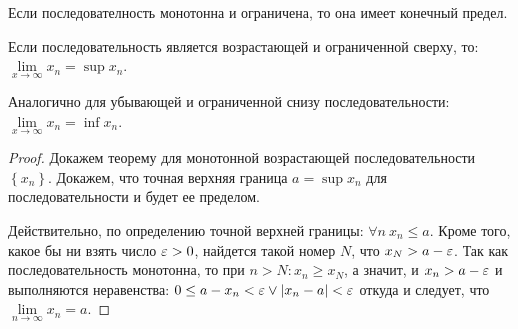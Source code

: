 \begin{ther}
    Если последователность монотонна и ограничена, то она имеет конечный предел.
\end{ther}

\begin{ther}

    Если последовательность является возрастающей и ограниченной сверху, то: $\lim\limits_{x \to \infty} x_n = \sup {x_n}$.

    Аналогично для убывающей и ограниченной снизу последовательности: $\lim\limits_{x \to \infty} x_n = \inf {x_n}$.
\end{ther}

\begin{proof}
    Докажем теорему для монотонной возрастающей последовательности $\left\{x_n\right\}$. Докажем, что точная верхняя граница $a = \sup{x_n}$ для последовательности и будет ее пределом.

    Действительно, по определению точной верхней границы: 
    $\forall n\ x_n \leq a$.
    Кроме того, какое бы ни взять число $\varepsilon > 0$, найдется такой номер $N$, что $x_N > a - \varepsilon$.
    Так как последовательность монотонна, то при $n > N: x_n \geq x_N$, а значит, и $x_n > a - \varepsilon$ и выполняются неравенства: $0 \leq a - x_n < \varepsilon \vee \left | x_n - a \right | <\varepsilon$
     откуда и следует, что $\lim\limits_{n \to \infty} x_n = a$.
\end{proof}
